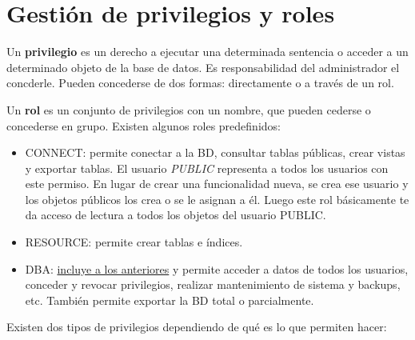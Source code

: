 \section{Gestión de privilegios y roles}

Un \textbf{privilegio} es un derecho a ejecutar una determinada sentencia o acceder a un determinado objeto de la base de datos. Es responsabilidad del administrador el concderle. Pueden concederse de dos formas: directamente o a través de un rol.

Un \textbf{rol} es un conjunto de privilegios con un nombre, que pueden cederse o concederse en grupo. Existen algunos roles predefinidos:
\begin{itemize}
\item CONNECT: permite conectar a la BD, consultar tablas públicas, crear vistas y exportar tablas. El usuario \textit{PUBLIC} representa a todos los usuarios con este permiso. En lugar de crear una funcionalidad nueva, se crea ese usuario y los objetos públicos los crea o se le asignan a él. Luego este rol básicamente te da acceso de lectura a todos los objetos del usuario PUBLIC.
\item RESOURCE: permite crear tablas e índices.
\item DBA: \underline{incluye a los anteriores} y permite acceder a datos de todos los usuarios, conceder y revocar privilegios, realizar mantenimiento de sistema y backups, etc. También permite exportar la BD total o parcialmente.
\end{itemize}

Existen dos tipos de privilegios dependiendo de qué es lo que permiten hacer:

